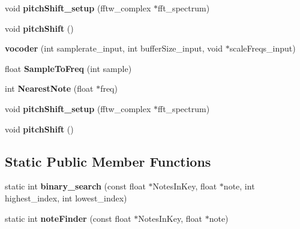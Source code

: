\begin{DoxyCompactItemize}
\item 
\hypertarget{classvocoder_aa3d122aee6d6ae77ac5b04572e924dc0}{void {\bfseries pitch\-Shift\-\_\-setup} (fftw\-\_\-complex $\ast$fft\-\_\-spectrum)}\label{classvocoder_aa3d122aee6d6ae77ac5b04572e924dc0}

\item 
\hypertarget{classvocoder_aa218678a51da7429066c32e59edd5057}{void {\bfseries pitch\-Shift} ()}\label{classvocoder_aa218678a51da7429066c32e59edd5057}

\item 
\hypertarget{classvocoder_a759189527108a2f32b992406b8210db8}{{\bfseries vocoder} (int samplerate\-\_\-input, int buffer\-Size\-\_\-input, void $\ast$scale\-Freqs\-\_\-input)}\label{classvocoder_a759189527108a2f32b992406b8210db8}

\item 
\hypertarget{classvocoder_a2b3a6e386d3a18f9366320e5743d33b1}{float {\bfseries Sample\-To\-Freq} (int sample)}\label{classvocoder_a2b3a6e386d3a18f9366320e5743d33b1}

\item 
\hypertarget{classvocoder_a8b1e51e28458338abc0eeaac00c1842f}{int {\bfseries Nearest\-Note} (float $\ast$freq)}\label{classvocoder_a8b1e51e28458338abc0eeaac00c1842f}

\item 
\hypertarget{classvocoder_aa3d122aee6d6ae77ac5b04572e924dc0}{void {\bfseries pitch\-Shift\-\_\-setup} (fftw\-\_\-complex $\ast$fft\-\_\-spectrum)}\label{classvocoder_aa3d122aee6d6ae77ac5b04572e924dc0}

\item 
\hypertarget{classvocoder_aa218678a51da7429066c32e59edd5057}{void {\bfseries pitch\-Shift} ()}\label{classvocoder_aa218678a51da7429066c32e59edd5057}

\end{DoxyCompactItemize}
\subsection*{Static Public Member Functions}
\begin{DoxyCompactItemize}
\item 
\hypertarget{classvocoder_a54dbb5d460704f880382d2ae7e64e14a}{static int {\bfseries binary\-\_\-search} (const float $\ast$Notes\-In\-Key, float $\ast$note, int highest\-\_\-index, int lowest\-\_\-index)}\label{classvocoder_a54dbb5d460704f880382d2ae7e64e14a}

\item 
\hypertarget{classvocoder_a450b5c7824587e81db5aa4c056ba6934}{static int {\bfseries note\-Finder} (const float $\ast$Notes\-In\-Key, float $\ast$note)}\label{classvocoder_a450b5c7824587e81db5aa4c056ba6934}

\end{DoxyCompactItemize}
